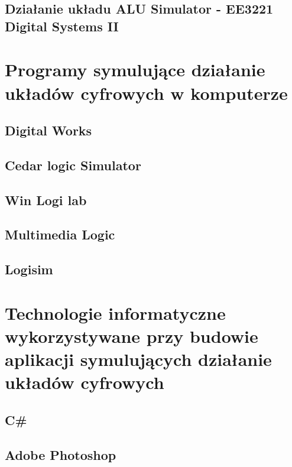 \documentclass[12pt, a4paper, onside, polish]{article}				%
\begin{document}
\subsection{Działanie układu ALU Simulator - EE3221 Digital Systems II}
\cleardoublepage

      


\section{Programy symulujące działanie układów cyfrowych w komputerze}
\subsection{Digital Works}
\cleardoublepage


\subsection{Cedar logic Simulator}
\cleardoublepage

\subsection{Win Logi lab}
\cleardoublepage

\subsection{Multimedia Logic}
\cleardoublepage

\subsection{Logisim}
\cleardoublepage



\section{Technologie informatyczne wykorzystywane przy budowie aplikacji symulujących działanie układów cyfrowych}
\subsection{C\#}
\cleardoublepage




\subsection{Adobe Photoshop}
\cleardoublepage
\end{document}
